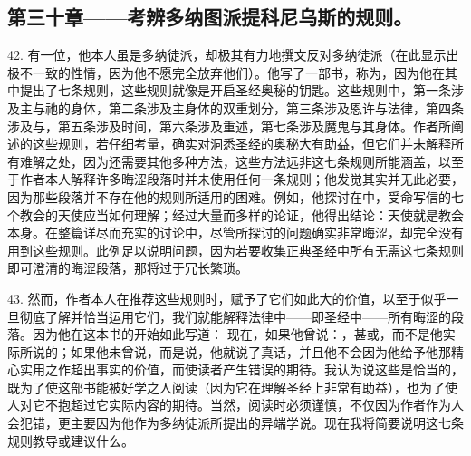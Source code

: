
\subsection{第三十章——考辨多纳图派提科尼乌斯的规则。}

42. 有一位，他本人虽是多纳徒派，却极其有力地撰文反对多纳徒派（在此显示出极不一致的性情，因为他不愿完全放弃他们）。他写了一部书，称为，因为他在其中提出了七条规则，这些规则就像是开启圣经奥秘的钥匙。这些规则中，第一条涉及主与祂的身体，第二条涉及主身体的双重划分，第三条涉及恩许与法律，第四条涉及与，第五条涉及时间，第六条涉及重述，第七条涉及魔鬼与其身体。作者所阐述的这些规则，若仔细考量，确实对洞悉圣经的奥秘大有助益，但它们并未解释所有难解之处，因为还需要其他多种方法，这些方法远非这七条规则所能涵盖，以至于作者本人解释许多晦涩段落时并未使用任何一条规则；他发觉其实并无此必要，因为那些段落并不存在他的规则所适用的困难。例如，他探讨在中，受命写信的七个教会的天使应当如何理解；经过大量而多样的论证，他得出结论：天使就是教会本身。在整篇详尽而充实的讨论中，尽管所探讨的问题确实非常晦涩，却完全没有用到这些规则。此例足以说明问题，因为若要收集正典圣经中所有无需这七条规则即可澄清的晦涩段落，那将过于冗长繁琐。\par

43. 然而，作者本人在推荐这些规则时，赋予了它们如此大的价值，以至于似乎一旦彻底了解并恰当运用它们，我们就能解释法律中——即圣经中——所有晦涩的段落。因为他在这本书的开始如此写道： 现在，如果他曾说：，甚或，而不是他实际所说的；如果他未曾说，而是说，他就说了真话，并且他不会因为他给予他那精心实用之作超出事实的价值，而使读者产生错误的期待。我认为说这些是恰当的，既为了使这部书能被好学之人阅读（因为它在理解圣经上非常有助益），也为了使人对它不抱超过它实际内容的期待。当然，阅读时必须谨慎，不仅因为作者作为人会犯错，更主要因为他作为多纳徒派所提出的异端学说。现在我将简要说明这七条规则教导或建议什么。\par


